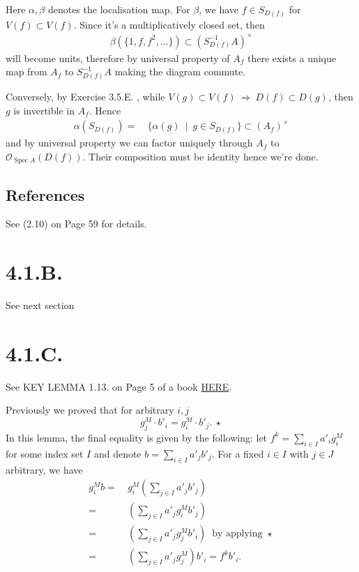 Here $\alpha,\beta$ denotes the localisation map. For $\beta$, we have $f\in S_{D(f)}$ for $V(f)\subset V(f)$. Since it's a multiplicatively closed set, then 
\begin{align*}
	\beta(\{1,f,f^2,...\})\subset (S_{D(f)}^{-1}A)^{\times} 
\end{align*} will become units, therefore by universal property of $A_f$ there exists a unique map from $A_f$ to $S_{D(f)}^{-1}A$ making the diagram commute. 

Conversely, by Exercise 3.5.E. , while $V(g)\subset V(f)~\Rightarrow~D(f)\subset D(g)$, then $g$ is invertible in $A_f$. Hence 
\begin{align*}
	\alpha(S_{D(f)})=&~\{\alpha(g) ~\mid~ g\in S_{D(f)}\}\subset (A_f)^{\times}
\end{align*} and by universal property we can factor uniquely through $A_f$ to $\mathscr O_{\operatorname{Spec}A}(D(f))$. Their composition must be identity hence we're done.

\subsection{References}

See \cite{gortz2020algebraic} (2.10) on Page 59 for details.

\section{4.1.B.}
See next section 

\section{4.1.C.}\label{4.1.C.}

See KEY LEMMA 1.13. on Page 5 of a book \href{https://www.dam.brown.edu/people/mumford/alg_geom/papers/AGII.pdf}{HERE}. 

Previously we proved that for arbitrary $i,j$ \[g_j^M\cdot b'_i=g_i^M\cdot b'_j.~\star\]
In this lemma, the final equality is given by the following: let $f^k=\sum_{i\in I} a'_ig_i^M$ for some index set $I$ and denote $b=\sum_{i\in I}a'_jb'_j$. For a fixed $i\in I$ with $j\in J$ arbitrary, we have
\begin{align*}
	g_i^Mb =&~ g_i^M\left(\sum_{j\in I} a'_jb'_j\right)\\
		=&~ \left(\sum_{j\in I} a'_jg_i^Mb'_j\right)\\
		=&~ \left(\sum_{j\in I} a'_jg_j^Mb'_i\right) ~\text{ by applying } \star\\
		=&~ \left(\sum_{j\in I} a'_jg_j^M\right)b'_i=f^kb'_i.
\end{align*}

